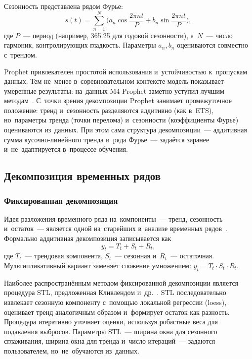 Сезонность представлена рядом Фурье:
\begin{equation}
\label{eq:prophet-season}
s(t) = \sum_{n=1}^{N}\biggl(a_n\cos\frac{2\pi n t}{P}
     + b_n\sin\frac{2\pi n t}{P}\biggr),
\end{equation}
где $P$~--- период (например, 365.25 для годовой сезонности), а~$N$~---
число гармоник, контролирующих гладкость.  Параметры $a_n, b_n$
оцениваются совместно с~трендом.

Prophet привлекателен простотой использования и~устойчивостью
к~пропускам данных.  Тем не~менее в~соревновательном контексте модель
показывает умеренные результаты: на~данных M4 Prophet заметно уступил
лучшим методам~\cite{makridakis2020m4}.  С~точки зрения декомпозиции
Prophet занимает промежуточное положение: тренд и~сезонность разделяются
аддитивно (как в~ETS), но~параметры тренда (точки перелома) и~сезонности
(коэффициенты Фурье) оцениваются из~данных.  При этом сама структура
декомпозиции~--- аддитивная сумма кусочно-линейного тренда и~ряда
Фурье~--- задаётся заранее и~не~адаптируется в~процессе обучения.


\subsection{Декомпозиция временных рядов}
\label{subsec:decomposition}

\subsubsection{Фиксированная декомпозиция}
\label{sssec:fixed-decomposition}

Идея разложения временного ряда на~компоненты~--- тренд, сезонность
и~остаток~--- является одной из~старейших в~анализе временных
рядов~\cite{aivazyan1998statistics}.  Формально аддитивная декомпозиция
записывается как
\begin{equation}
\label{eq:decomposition}
y_t = T_t + S_t + R_t,
\end{equation}
где $T_t$~--- трендовая компонента, $S_t$~--- сезонная и~$R_t$~---
остаточная.  Мультипликативный вариант заменяет сложение умножением:
$y_t = T_t \cdot S_t \cdot R_t$.

Наиболее распространённым методом фиксированной декомпозиции является
процедура STL,
предложенная Кливлендом и~др.~\cite{cleveland1990stl}.  STL
последовательно извлекает сезонную компоненту с~помощью локальной
регрессии (loess), оценивает тренд аналогичным образом и~формирует
остаток как разность.  Процедура итеративно уточняет оценки, используя
робастные веса для подавления выбросов.  Параметры STL~--- ширина окна
для сезонного сглаживания, ширина окна для тренда и~число итераций~---
задаются пользователем, но~не~обучаются из~данных.

